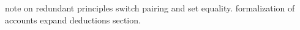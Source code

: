 
note on redundant principles
switch pairing and set equality.
formalization of accounts
expand deductions section.

\blankpage
